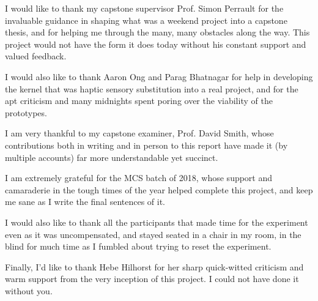\documentclass[
12pt, %
oneside, %
english, %
doublespacing, %
headsepline, %
]{MastersDoctoralThesis} %
\begin{document}
\begin{acknowledgements}
\addchaptertocentry{\acknowledgementname} %

I would like to thank my capstone supervisor Prof. Simon Perrault for the invaluable guidance in shaping what was a weekend project into a capstone thesis, and for helping me through the many, many obstacles along the way. This project would not have the form it does today without his constant support and valued feedback.

I would also like to thank Aaron Ong and Parag Bhatnagar for help in developing the kernel that was haptic sensory substitution into a real project, and for the apt criticism and many midnights spent poring over the viability of the prototypes.

I am very thankful to my capstone examiner, Prof. David Smith, whose contributions both in writing and in person to this report have made it (by multiple accounts) far more understandable yet succinct.

I am extremely grateful for the MCS batch of 2018, whose support and camaraderie in the tough times of the year helped complete this project, and keep me sane as I write the final sentences of it.

I would also like to thank all the participants that made time for the experiment even as it was uncompensated, and stayed seated in a chair in my room, in the blind for much time as I fumbled about trying to reset the experiment.

Finally, I'd like to thank Hebe Hilhorst for her sharp quick-witted criticism and warm support from the very inception of this project. I could not have done it without you.

\end{acknowledgements}


\tableofcontents %

\listoffigures %

\listoftables %

\end{document}
